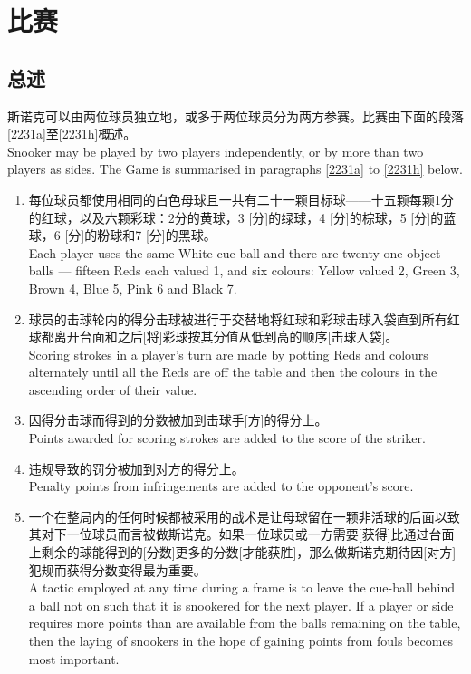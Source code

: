 \section{比赛}\label{223}

\subsection{总述}

\noindent 斯诺克可以由两位球员独立地，或多于两位球员分为两方参赛。比赛由下面的段落\ref{2231a}至\ref{2231h}概述。\\
Snooker may be played by two players independently, or by more than two players as sides. The Game is summarised in paragraphs \ref{2231a} to \ref{2231h} below.
\begin{enumerate}[label=(\alph*)]
    \item \label{2231a}每位球员都使用相同的白色母球且一共有二十一颗目标球——十五颗每颗1分的红球，以及六颗彩球：2分的黄球，3 [分]的绿球，4 [分]的棕球，5 [分]的蓝球，6 [分]的粉球和7 [分]的黑球。\\
    Each player uses the same White cue-ball and there are twenty-one object balls --- fifteen Reds each valued 1, and six colours: Yellow valued 2, Green 3, Brown 4, Blue 5, Pink 6 and Black 7.
    \item 球员的击球轮内的得分击球被进行于交替地将红球和彩球击球入袋直到所有红球都离开台面和之后[将]彩球按其分值从低到高的顺序[击球入袋]。\\
    Scoring strokes in a player's turn are made by potting Reds and colours alternately until all the Reds are off the table and then the colours in the ascending order of their value.
    \item 因得分击球而得到的分数被加到击球手[方]的得分上。\\
    Points awarded for scoring strokes are added to the score of the striker.
    \item 违规导致的罚分被加到对方的得分上。\\
    Penalty points from infringements are added to the opponent's score.
    \item 一个在整局内的任何时候都被采用的战术是让母球留在一颗非活球的后面以致其对下一位球员而言被做斯诺克。如果一位球员或一方需要[获得]比通过台面上剩余的球能得到的[分数]更多的分数[才能获胜]，那么做斯诺克期待因[对方]犯规而获得分数变得最为重要。\\
    A tactic employed at any time during a frame is to leave the cue-ball behind a ball not on such that it is snookered for the next player. If a player or side requires more points than are available from the balls remaining on the table, then the laying of snookers in the hope of gaining points from fouls becomes most important.

\end{enumerate}
